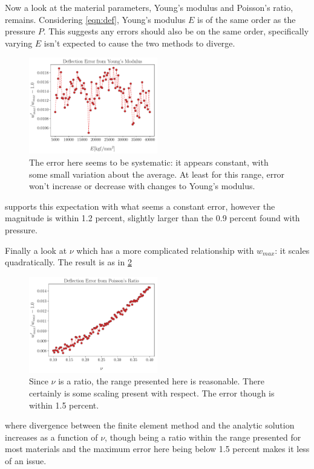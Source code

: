 \documentclass[12pt,times,twocolumn,3p]{elsarticle}
\begin{document}
Now a look at the material parameters, Young's modulus and Poisson's ratio, remains.
Considering \cref{eqn:def}, Young's modulus $E$ is of the same order as the pressure $P$.
This suggests any errors should also be on the same order, specifically varying $E$
isn't expected to cause the two methods to diverge. 
\begin{figure}[h]
    \centering
    \includegraphics[width=0.5\textwidth]{./ym_scaling_err.pdf}
    \caption{The error here seems to be systematic: it appears constant, with some
    small variation about the average. At least for this range, error won't increase
    or decrease with changes to Young's modulus.}
    \label{fig:vre}
\end{figure}
supports this expectation with what seems a constant error, however the magnitude
is within 1.2 percent, slightly larger than the 0.9 percent found with pressure.

Finally a look at $\nu$ which has a more complicated relationship with $w_{max}$:
it scales quadratically. The result is as in \cref{fig:nu} 
\begin{figure}[h]
    \centering
    \includegraphics[width=0.5\textwidth]{./nu_scaling_err.pdf}
    \caption{Since $\nu$ is a ratio, the range presented here is reasonable. There
    certainly is some scaling present with respect. The error though is within 1.5
    percent.}
    \label{fig:nu}
\end{figure}
where divergence between the finite element method and the analytic solution increases
as a function of $\nu$, though being a ratio within the range presented for most
materials and the maximum error here being below 1.5 percent makes it less of an
issue.
\end{document}
